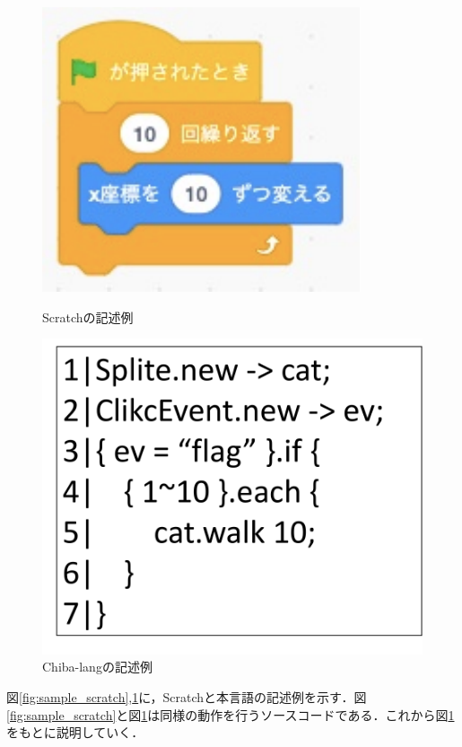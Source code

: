 \documentclass[twocolumn,10pt,a4j]{ltjsarticle}
\begin{document}
\begin{figure}[h]
  \begin{minipage}[b]{0.5\linewidth}
    \centering
    \includegraphics[scale=0.5]{figures/sample_scratch.pdf}
    \caption{Scratchの記述例}
    \label{fig:sample_scratch}
  \end{minipage}
  \begin{minipage}[b]{0.5\linewidth}
    \centering
    \includegraphics[scale=0.2]{figures/sample_chb.pdf}
    \caption{Chiba-langの記述例}
    \label{fig:sample_chb}
  \end{minipage}
\end{figure}

図\ref{fig:sample_scratch},\ref{fig:sample_chb}に，Scratchと本言語の記述例を示す．図\ref{fig:sample_scratch}と図\ref{fig:sample_chb}は同様の動作を行うソースコードである．これから図\ref{fig:sample_chb}をもとに説明していく．
\end{document}
